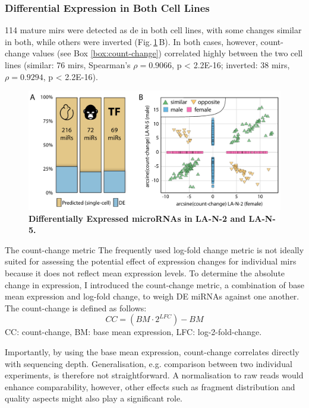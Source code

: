 \subsubsection{Differential Expression in Both Cell Lines}


114 mature \acp{mir} were detected as \ac{de} in both cell lines, with some changes similar in both, while others were inverted (Fig.\,\ref{fig:cc-cor-de-perm}\,B). In both cases, however, count-change values (see Box \ref{box:count-change}) correlated highly between the two cell lines (similar: 76 \acp{mir}, Spearman’s $\rho = 0.9066$, p < 2.2E-16; inverted: 38 \acp{mir}, $\rho = 0.9294$, p < 2.2E-16).

\begin{figure}[ht]
\centering
\includegraphics[width=\textwidth]{figures/cc-cor-de-perm}
\caption[Differentially Expressed microRNAs in LA-N-2 and LA-N-5.]{\textbf{Differentially Expressed microRNAs in LA-N-2 and LA-N-5.}
\label{fig:cc-cor-de-perm}}
\end{figure}

\begin{mybox}{The count-change metric}\label{box:count-change}
The frequently used log-fold change metric is not ideally suited for assessing the potential effect of expression changes for individual \acp{mir} because it does not reflect mean expression levels. To determine the absolute change in expression, I introduced the count-change metric, a combination of base mean expression and log-fold change, to weigh DE miRNAs against one another. The count-change is defined as follows: $$CC = (BM \cdot 2^{LFC}) - BM$$
CC: count-change, BM: base mean expression, LFC: log-2-fold-change.

Importantly, by using the base mean expression, count-change correlates directly with sequencing depth. Generalisation, e.g. comparison between two individual experiments, is therefore not straightforward. A normalisation to raw reads would enhance comparability, however, other effects such as fragment distribution and quality aspects might also play a significant role.
\end{mybox}

